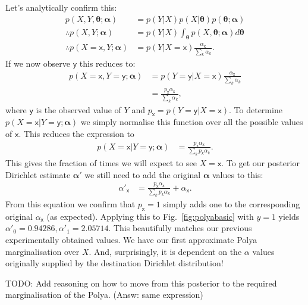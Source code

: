 \documentclass[oneside,english]{scrbook}
\begin{document}
Let's analytically confirm this:
\begin{align*}
  p(X,Y,\bm{\theta};\bm{\alpha}) &= p(Y|X)p(X|\bm{\theta})p(\bm{\theta};\bm{\alpha})\\
  \therefore p(X,Y;\bm{\alpha}) &= p(Y|X)\int_{\bm{\theta}} p(X,\bm{\theta};\bm{\alpha}) d\bm{\theta} \\
  \therefore p(X=\mathsf{x},Y;\bm{\alpha}) &= p(Y|X=\mathsf{x})\frac{\alpha_{\mathsf{x}}}{\sum_k{\alpha_k}}.
\end{align*}
If we now observe $\mathsf{y}$ this reduces to:
\begin{align*}
  p(X=\mathsf{x},Y=\mathsf{y};\bm{\alpha}) &= p(Y=\mathsf{y}|X=\mathsf{x})\frac{\alpha_{\mathsf{x}}}{\sum_k{\alpha_k}} \\
  &= \frac{p_{\mathsf{x}}\alpha_{\mathsf{x}}}{\sum_k{\alpha_k}},
\end{align*}
where $\mathsf{y}$ is the observed value of $Y$ and $p_{\mathsf{x}} =
p(Y=\mathsf{y}|X=\mathsf{x})$. To determine
$p(X=\mathsf{x}|Y=\mathsf{y};\bm{\alpha})$ we simply normalise this
function over all the possible values of $\mathsf{x}$. This reduces the expression to
\begin{align}
  p(X=\mathsf{x}|Y=\mathsf{y};\bm{\alpha}) &= \frac{p_{\mathsf{x}}\alpha_{\mathsf{x}}}{\sum_k{p_k\alpha_k}}.
  \label{eq:dirich_est_msg}
\end{align}
This gives the fraction of times we will expect to see $X =
\mathsf{x}$. To get our posterior Dirichlet estimate $\bm{\alpha}'$ we still
need to add the original $\bm{\alpha}$ values to this:
\begin{align}
  \alpha'_{\mathsf{x}} &= \frac{p_{\mathsf{x}}\alpha_{\mathsf{x}}}{\sum_k{p_k\alpha_k}} + \alpha_{\mathsf{x}}.
  \label{eq:dirich_est_post}
\end{align}
From this equation we confirm that $p_{\mathsf{x}}=1$ simply adds one
to the corresponding original $\alpha_{\mathsf{x}}$ (as expected).
Applying this to Fig.~\ref{fig:polyabasic} with $y=1$ yields
$\alpha'_0 = 0.94286, \alpha'_1= 2.05714$.  This beautifully matches
our previous experimentally obtained values. We have our first
approximate Polya marginalisation over $X$. And, surprisingly, it is
dependent on the $\alpha$ values originally supplied by the
destination Dirichlet distribution!

TODO: Add reasoning on how to move from this posterior to the required
marginalisation of the Polya. (Answ: same expression)
\end{document}
